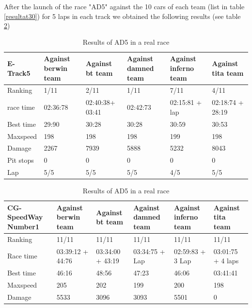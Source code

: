 \documentclass{llncs}
\begin{document}
After the launch of the race "AD5" against the 10 cars of each team (list in table \ref{resultat30}) for 5 laps in each track we obtained the following results (see table \ref{resultat31})
\begin{table}[h!]
	\caption{Results of AD5  in a real race}
	\label{resultat31}
	\begin{tabular}{ |p{3cm}|p{2cm}|p{2cm}|p{2 cm}|p{2 cm}|p{2 cm}|}
		\hline
		{ \color{blue}\textbf{E-Track5} }&
		{ \color{red}\textbf{Against berwin team }}&  
		{ \color{red} \textbf{Against bt team} } &
		{ \color{red} \textbf{Against damned team} } &
		{ \color{red} \textbf{Against inferno team} }&
		{ \color{red} \textbf{Against tita team} }
		\\
		\hline
		Ranking & 1/11 & 2/11   & 1/11 & 7/11& 4/11
		\\
		\hline
		race time & 02:36:78 & 02:40:38+ 03:41   & 02:42:73 & 02:15:81 + lap & 02:18:74 + 28:19
		\\
		\hline
		Best time & 29:90 & 30:28   & 30:28 & 30:59& 30:53 
		\\
		\hline 
		Maxspeed & 198 & 198 &  198 & 199 & 198
		\\
		\hline
		
		Damage & 2267 & 7939 &  5888 & 5232& 8043
		\\
		\hline 
		
		
		Pit stops & 0& 0  & 0 & 0 & 0
		\\
		\hline 	
		Lap & 5/5 & 5/5  & 5/5 & 4/5 & 5/5
		\\
		\hline
	\end{tabular} 
	\begin{tabular}{ |p{3cm}|p{2cm}|p{2cm}|p{2 cm}|p{2 cm}|p{2 cm}|}
		\hline
		{ \color{blue}\textbf{CG-SpeedWay Number1} }&
		{ \color{red}\textbf{Against berwin team }}&  
		{ \color{red} \textbf{Against bt team} } &
		{ \color{red} \textbf{Against damned team} } &
		{ \color{red} \textbf{Against inferno team} }&
		{ \color{red} \textbf{Against tita team} }
		\\
		\hline
		Ranking  & 11/11  & 11/11  & 11/11  & 11/11& 11/11
		\\
		\hline
		Race time & 03:39:12 + 44:76 & 03:34:00 + 43:19 & 03:34:75 + Lap & 02:59:83 + 3 Lap   & 03:01:75 + 4 laps
		\\
		\hline
		Best time& 46:16   & 48:56 & 47:23 & 46:06 & 03:41:41
		\\
		\hline 
		Maxspeed & 205 & 202 & 199 & 200 & 198
		\\
		\hline
		Damage &  5533 & 3096 & 3093 & 5501& 0
		\\
		\hline 
		

\end{tabular}
\end{table}
\end{document}
